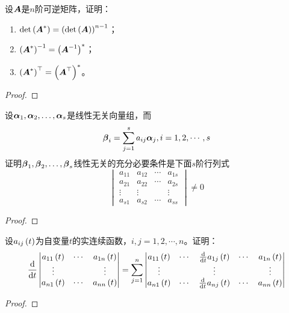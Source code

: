 \begin{problem}
设\(\boldsymbol{A}\)是\(n\)阶可逆矩阵，证明：
\begin{enumerate}
    \item \(\mathrm{det}\left( \boldsymbol{A}^* \right)=\left( \mathrm{det}\left( \boldsymbol{A} \right) \right)^{n-1}\)；
    \item \({\left( \boldsymbol{A}^* \right)}^{-1}=\left( {\boldsymbol{A}}^{-1} \right)^*\)；
    \item \(\left( \boldsymbol{A}^* \right)^\top=\left( \boldsymbol{A}^\top \right)^*\)。
\end{enumerate}
\end{problem}
\begin{proof}
\end{proof}

\begin{problem}
设\({\boldsymbol{\alpha}}_1,{\boldsymbol{\alpha}}_2,\dots,{\boldsymbol{\alpha}}_{s}\)是线性无关向量组，而
\begin{equation*}
    \boldsymbol{\beta}_i=\sum_{j=1}^sa_{ij}\boldsymbol{\alpha}_j,i=1,2,\cdots,s
\end{equation*}
证明\({\boldsymbol{\beta}}_1,{\boldsymbol{\beta}}_2,\dots,{\boldsymbol{\beta}}_{s}\)线性无关的充分必要条件是下面\(s\)阶行列式
\begin{equation*}
    \begin{vmatrix}
        a_{11} & a_{12} & \cdots & a_{1s} \\
        a_{21} & a_{22} & \cdots & a_{2s} \\
        \vdots & \vdots &        & \vdots \\
        a_{s1} & a_{s2} & \cdots & a_{ss}
    \end{vmatrix}\neq0
\end{equation*}
\end{problem}
\begin{proof}
\end{proof}

\begin{problem}
设\(a_{ij}\left( t \right)\)为自变量\(t\)的实连续函数，\(i,j=1,2,\cdots,n\)。证明：
\begin{equation*}
    \frac{\mathrm{d}}{\mathrm{d} t}
    \begin{vmatrix}
        a_{11}\left( t \right) & \cdots & a_{1n}\left( t \right) \\
        \vdots         &        & \vdots         \\
        a_{n1}\left( t \right) & \cdots & a_{nn}\left( t \right)
    \end{vmatrix}=\sum_{j=1}^n
    \begin{vmatrix}
        a_{11}\left( t \right) & \cdots & \frac{\mathrm{d}}{\mathrm{d} t}a_{1j}\left( t \right) & \cdots & a_{1n}\left( t \right) \\
        \vdots         &        & \vdots                    &        & \vdots         \\
        a_{n1}\left( t \right) & \cdots & \frac{\mathrm{d}}{\mathrm{d} t}a_{nj}\left( t \right) & \cdots & a_{nn}\left( t \right)
    \end{vmatrix}
\end{equation*}
\end{problem}
\begin{proof}
\end{proof}

